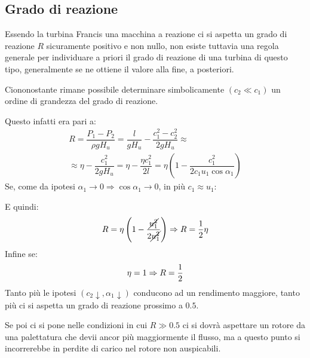\documentclass[a4paper, 15pt]{article}
\begin{document}
\subsection{Grado di reazione}
\begin{adjustwidth}{2in}{}
	Essendo la turbina Francis una macchina a reazione ci si aspetta un grado di reazione $R$ sicuramente positivo e non nullo, non esiste tuttavia una regola generale per individuare a priori il grado di reazione di una turbina di questo tipo, generalmente se ne ottiene il valore alla fine, a posteriori. \newline 
	
	Ciononostante rimane possibile determinare simbolicamente {\footnotesize $(c_2\ll c_1)$} un ordine di grandezza del grado di reazione. 
	
	Questo infatti era pari a:
	\[\begin{split}
		R = \dfrac{P_1-P_2}{\rho g H_u} = \dfrac{l}{gH_u}-\dfrac{c_1^2-c_2^2}{2gH_u} \approx \\ 
		\approx \eta - \dfrac{c_1^2}{2gH_u} = \eta - \dfrac{\eta c_1^2}{2l} = \eta\left(1-\dfrac{c_1^2}{2c_1u_1\cos\alpha_1}\right) 
	\end{split} \]
	Se, come da ipotesi $\alpha_1\rightarrow0\Rightarrow\cos\alpha_1\rightarrow0$, in più $c_1\approx u_1$:
	
	
	E quindi:
	\[R = \eta\left(1-\dfrac{\cancel{u_1^2}}{2\cancel{u_1^2}}\right)\Rightarrow R = {1\over2}\eta\]
	Infine se:
	\[\eta = 1 \Rightarrow R = {1\over2}\]
	Tanto più le ipotesi {\footnotesize $(c_2\downarrow, \alpha_1\downarrow)$} conducono ad un rendimento maggiore, tanto più ci si aspetta un grado di reazione prossimo a $0.5$. 
	
	Se poi ci si pone nelle condizioni in cui $R\gg0.5$ ci si dovrà aspettare un rotore da una palettatura che devii ancor più maggiormente il flusso, ma a questo punto si incorrerebbe in perdite di carico nel rotore non auspicabili. 
\end{adjustwidth}
	
	
	
\end{document}
